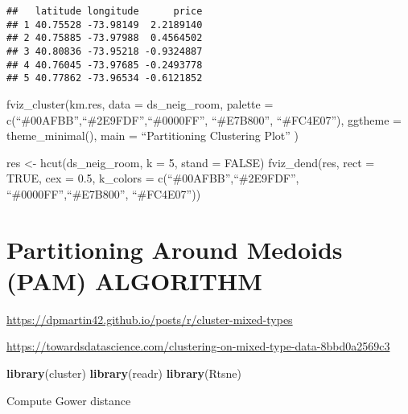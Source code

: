 \documentclass[
]{article}
\newenvironment{Shaded}{\begin{snugshade}}{\end{snugshade}}
\newcommand{\CommentTok}[1]{\textcolor[rgb]{0.56,0.35,0.01}{\textit{#1}}}
\newcommand{\DataTypeTok}[1]{\textcolor[rgb]{0.13,0.29,0.53}{#1}}
\newcommand{\DecValTok}[1]{\textcolor[rgb]{0.00,0.00,0.81}{#1}}
\newcommand{\KeywordTok}[1]{\textcolor[rgb]{0.13,0.29,0.53}{\textbf{#1}}}
\newcommand{\NormalTok}[1]{#1}
\newcommand{\OperatorTok}[1]{\textcolor[rgb]{0.81,0.36,0.00}{\textbf{#1}}}
\newcommand{\StringTok}[1]{\textcolor[rgb]{0.31,0.60,0.02}{#1}}
\begin{document}
\begin{Shaded}
\end{Shaded}

\begin{verbatim}
##   latitude longitude      price
## 1 40.75528 -73.98149  2.2189140
## 2 40.75885 -73.97988  0.4564502
## 3 40.80836 -73.95218 -0.9324887
## 4 40.76045 -73.97685 -0.2493778
## 5 40.77862 -73.96534 -0.6121852
\end{verbatim}

fviz\_cluster(km.res, data = ds\_neig\_room, palette =
c(``\#00AFBB'',``\#2E9FDF'',``\#0000FF'', ``\#E7B800'', ``\#FC4E07''),
ggtheme = theme\_minimal(), main = ``Partitioning Clustering Plot'' )

res \textless- hcut(ds\_neig\_room, k = 5, stand = FALSE)
fviz\_dend(res, rect = TRUE, cex = 0.5, k\_colors =
c(``\#00AFBB'',``\#2E9FDF'', ``\#0000FF'',``\#E7B800'', ``\#FC4E07''))

\hypertarget{partitioning-around-medoids-pam-algorithm}{%
\section{Partitioning Around Medoids (PAM)
ALGORITHM}\label{partitioning-around-medoids-pam-algorithm}}

\url{https://dpmartin42.github.io/posts/r/cluster-mixed-types}

\url{https://towardsdatascience.com/clustering-on-mixed-type-data-8bbd0a2569c3}

\begin{Shaded}
\begin{Highlighting}[]
\KeywordTok{library}\NormalTok{(cluster)}
\KeywordTok{library}\NormalTok{(readr)}
\KeywordTok{library}\NormalTok{(Rtsne)}
\end{Highlighting}
\end{Shaded}

Compute Gower distance

\begin{Shaded}
\end{Shaded}
\end{document}
